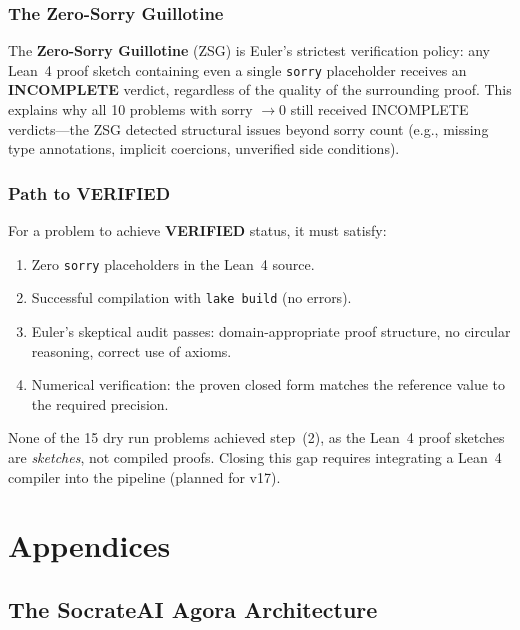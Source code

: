 \documentclass[12pt,a4paper]{report}
\theoremstyle{plain}
\theoremstyle{definition}
\theoremstyle{remark}
\newcommand{\sorry}{\textcolor{sorryred}{\texttt{sorry}}}
\begin{document}
\section{The Zero-Sorry Guillotine}

The \textbf{Zero-Sorry Guillotine} (ZSG) is Euler's strictest verification policy:
any Lean~4 proof sketch containing even a single \sorry{} placeholder receives an
\textbf{INCOMPLETE} verdict, regardless of the quality of the surrounding proof.
This explains why all 10 problems with sorry $\to 0$ still received INCOMPLETE
verdicts—the ZSG detected structural issues beyond sorry count (e.g., missing
type annotations, implicit coercions, unverified side conditions).

\section{Path to VERIFIED}

For a problem to achieve \textbf{VERIFIED} status, it must satisfy:
\begin{enumerate}
  \item Zero \sorry{} placeholders in the Lean~4 source.
  \item Successful compilation with \texttt{lake build} (no errors).
  \item Euler's skeptical audit passes: domain-appropriate proof structure,
    no circular reasoning, correct use of axioms.
  \item Numerical verification: the proven closed form matches the reference
    value to the required precision.
\end{enumerate}

None of the 15 dry run problems achieved step~(2), as the Lean~4 proof sketches
are \emph{sketches}, not compiled proofs. Closing this gap requires integrating
a Lean~4 compiler into the pipeline (planned for v17).

\part{Appendices}

\appendix

\chapter{The SocrateAI Agora Architecture}
\label{app:agora}
\end{document}
